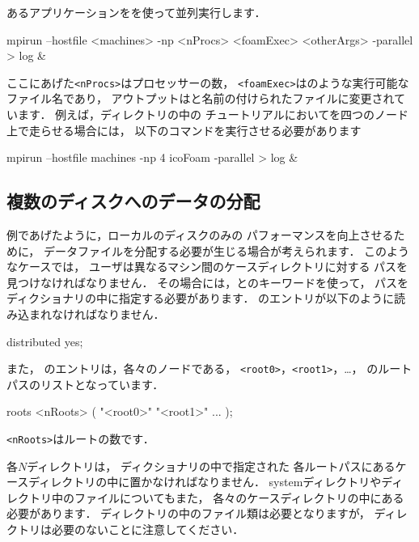 あるアプリケーションをを使って並列実行します．
\begin{OFverbatim}[terminal]
mpirun --hostfile <machines> -np <nProcs>
    <foamExec> <otherArgs> -parallel > log &
\end{OFverbatim}
ここにあげた\verb|<nProcs>|はプロセッサーの数，
\verb|<foamExec>|はのような実行可能なファイル名であり，
アウトプットはと名前の付けられたファイルに変更されています．
例えば，ディレクトリの中の
チュートリアルにおいてを四つのノード上で走らせる場合には，
以下のコマンドを実行させる必要があります
\begin{OFverbatim}[terminal]
mpirun --hostfile machines -np 4 icoFoam -parallel > log &
\end{OFverbatim}%

\subsection{複数のディスクへのデータの分配}
\label{ssec:3.4.3}
例であげたように，ローカルのディスクのみの
パフォーマンスを向上させるために，
データファイルを分配する必要が生じる場合が考えられます．
このようなケースでは，
ユーザは異なるマシン間のケースディレクトリに対する
パスを見つけなければなりません．
その場合には，とのキーワードを使って，
パスをディクショナリの中に指定する必要があります．
%
%
のエントリが以下のように読み込まれなければなりません．
\begin{OFverbatim}[leftskip=3em]
distributed  yes;
\end{OFverbatim}
また，
%
%
のエントリは，各々のノードである，
\verb|<root0>|，\verb|<root1>|，\ldots，
のルートパスのリストとなっています．
\begin{OFverbatim}[leftskip=3em]
roots
<nRoots>
(
   "<root0>"
   "<root1>"
   ...
);
\end{OFverbatim}
\verb|<nRoots>|はルートの数です．

各$N$ディレクトリは，
ディクショナリの中で指定された
各ルートパスにあるケースディレクトリの中に置かなければなりません．
systemディレクトリやディレクトリ中のファイルについてもまた，
各々のケースディレクトリの中にある必要があります．
ディレクトリの中のファイル類は必要となりますが，
ディレクトリは必要のないことに注意してください．


